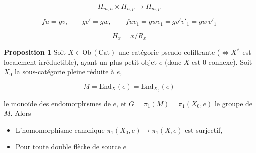 \documentclass[11pt,a4paper]{article}
\begin{document}




\[
  H_{m,n} \times H_{n,p} \longrightarrow H_{m,p}
\]

\[
  fu = gv, \qquad gv' = gw, \qquad fuv_{1} = gwv_{1} = gv'v'_{1} = gw\,v'_{1}
\]

\[
  H_{x} = x/R_{x}
\]



\textbf{Proposition 1} Soit $X \in \mathrm{Ob}\,(\mathrm{Cat})$ une catégorie
\struck{\ill{}} pseudo-cofiltrante ($\Longleftrightarrow X^{\wedge}$ est
localement irréductible), ayant un plus petit objet $e$ (donc $X$ est
$0$-connexe). Soit $X_{0}$ la sous-catégorie pleine réduite à $e$,

\[
  M = \mathrm{End}_{X}(e) = \mathrm{End}_{X_{0}}(e)
\]

le monoïde des endomorphismes de $e$, et
$G = \pi_{1}(M) = \pi_{1}(X_{0}, e)$ le groupe  de $M$.
Alors

\begin{itemize}
\item[a)] L'homomorphisme canonique
$\pi_{1}(X_{0}, e) \longrightarrow \pi_{1}(X,e)$ est surjectif, 
\item[b)] Pour toute double flèche de source $e$
\end{itemize}
\end{document}
